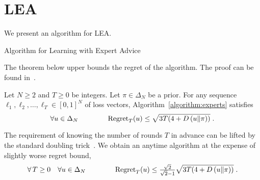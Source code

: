\section{\acl{LEA}}
\label{section:experts}

We present an algorithm for \ac{LEA}.

\begin{algorithm}[h]
\begin{algorithmic}
\caption{Algorithm for Learning with Expert Advice \label{algorithm:experts}}
{
\ENDFOR
}
\end{algorithmic}
\end{algorithm}


The theorem below upper bounds the regret of the algorithm.
The proof can be found in~\cite{Orabona-Pal-2016-parameter-free}.

\begin{theorem}
\label{theorem:experts-regret}
Let $N \ge 2$ and $T \ge 0$ be integers. Let $\pi \in \Delta_N$ be a prior.
For any sequence $\ell_1, \ell_2, \dots, \ell_T \in
[0,1]^N$ of loss vectors, Algorithm~\ref{algorithm:experts}
satisfies
$$
\forall u \in \Delta_N \qquad \qquad \operatorname{Regret}_T(u) \le \sqrt{3T (4 + D\left({u}\middle\|{\pi}\right))} \; .
$$
\end{theorem}

The requirement of knowing the number of rounds $T$ in advance can be lifted by
the standard doubling trick~\citep[Section 2.3.1]{Shalev-Shwartz-2011}. We obtain
an anytime algorithm at the expense of slightly worse regret bound,
$$
\forall \, T \ge 0 \quad \forall u \in \Delta_N \qquad \qquad
\operatorname{Regret}_T(u) \le \tfrac{\sqrt{2}}{\sqrt{2} - 1} \sqrt{3T (4 + D\left({u}\middle\|{\pi}\right))} \; .
$$


